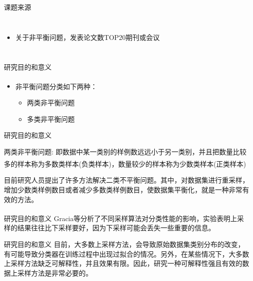 \documentclass{beamer}
\newcommand{\upcite}[1]{\textsuperscript{\textsuperscript{\cite{#1}}}} %
\begin{document}
\begin{frame}{课题来源}
\begin{columns}
\begin{minipage}[c][0.4\textheight][c]{\linewidth}
            \end{minipage}

            \begin{minipage}[c][0.4\textheight][c]{\linewidth}
                \begin{itemize}
                    \item 关于非平衡问题，发表论文数TOP20期刊或会议
                \end{itemize}
                
            \end{minipage}
        \end{columns}
\end{frame}

\begin{frame}{研究目的和意义}\pause
    \begin{itemize}
        \item 非平衡问题分类如下两种\upcite{haixiang2017learning}：
        \begin{itemize}
            \item 两类非平衡问题 
            \item 多类非平衡问题
        \end{itemize}
    \end{itemize}
\end{frame}

\begin{frame}{研究目的和意义}\pause
    \begin{block}{两类非平衡问题:}
        即数据中某一类别的样例数远远小于另一类别，并且把数量比较多的样本称为多数类样本(负类样本)，数量较少的样本称为少数类样本(正类样本)\upcite{wang2012multiclass,he2008learning,van2009knowledge}
    \end{block}
    目前研究人员提出了许多方法解决二类不平衡问题。其中，对数据集进行重采样，增加少数类样例数目或者减少多数类样例数目，使数据集平衡化，就是一种非常有效的方法。
\end{frame}


\begin{frame}{研究目的和意义}\pause
    Gracia等\upcite{garcia2012effectiveness}分析了不同采样算法对分类性能的影响，实验表明上采样的结果往往比下采样要好，因为下采样可能会丢失一些重要的信息。
\end{frame}



\begin{frame}{研究目的和意义}\pause
    目前，大多数上采样方法，会导致原始数据集类别分布的改变，有可能导致分类器在训练过程中出现过拟合的情况。另外，在某些情况下，大多数上采样方法缺乏可解释性，并且效果有限。因此，研究一种可解释性强且有效的数据上采样方法是非常必要的。
\end{frame}
\end{document}
